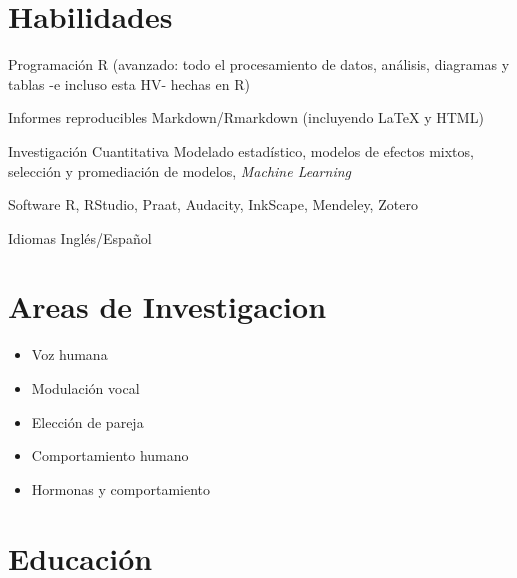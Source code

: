 \documentclass[11pt,a4paper,]{awesome-cv}
\providecommand{\tightlist}{%
	\setlength{\itemsep}{0pt}\setlength{\parskip}{0pt}}
\begin{document}
\hypertarget{habilidades}{%
\section{Habilidades}\label{habilidades}}

\begin{cvskills}
  \cvskill
    {Programación}
    {R (avanzado: todo el procesamiento de datos, análisis, diagramas y tablas -e incluso esta HV- hechas en R)}

  \cvskill
    {Informes reproducibles}
    {Markdown/Rmarkdown (incluyendo {\selectfont\LaTeX} y HTML)}

  \cvskill
    {Investigación Cuantitativa}
    {Modelado estadístico, modelos de efectos mixtos, selección y promediación de modelos, \textit{Machine Learning}}

  \cvskill
    {Software}
    {R, RStudio, Praat, Audacity, InkScape, Mendeley, Zotero}

  \cvskill
    {Idiomas}
    {Inglés/Español}
\end{cvskills}

\hypertarget{areas-de-investigacion}{%
\section{Areas de Investigacion}\label{areas-de-investigacion}}

\begin{itemize}
\tightlist
\item
  Voz humana
\item
  Modulación vocal
\item
  Elección de pareja
\item
  Comportamiento humano
\item
  Hormonas y comportamiento
\end{itemize}

\hypertarget{educaciuxf3n}{%
\section{Educación}\label{educaciuxf3n}}
\end{document}

